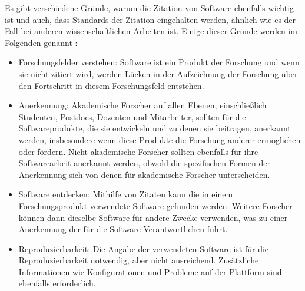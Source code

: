 Es gibt verschiedene Gründe, warum die Zitation von Software ebenfalls wichtig ist und auch, dass Standards der Zitation eingehalten werden, ähnlich wie es der Fall bei anderen wissenschaftlichen Arbeiten ist.
Einige dieser Gründe werden im Folgenden genannt \autocite{smith_software_2016}:

\begin{itemize}
    \item Forschungsfelder verstehen: Software ist ein Produkt der Forschung und wenn sie nicht zitiert wird, werden Lücken in der Aufzeichnung der Forschung über den Fortschritt in diesem Forschungsfeld entstehen.
    \item Anerkennung: Akademische Forscher auf allen Ebenen, einschließlich Studenten, Postdocs, Dozenten und Mitarbeiter, sollten für die Softwareprodukte, die sie entwickeln und zu denen sie beitragen, anerkannt werden, insbesondere wenn diese Produkte die Forschung anderer ermöglichen oder fördern. Nicht-akademische Forscher sollten ebenfalls für ihre Softwarearbeit anerkannt werden, obwohl die spezifischen Formen der Anerkennung sich von denen für akademische Forscher unterscheiden.
    \item Software entdecken: Mithilfe von Zitaten kann die in einem Forschungsprodukt verwendete Software gefunden werden. Weitere Forscher können dann dieselbe Software für andere Zwecke verwenden, was zu einer Anerkennung der für die Software Verantwortlichen führt.
    \item Reproduzierbarkeit: Die Angabe der verwendeten Software ist für die Reproduzierbarkeit notwendig, aber nicht ausreichend. Zusätzliche Informationen wie Konfigurationen und Probleme auf der Plattform sind ebenfalls erforderlich.
\end{itemize}
